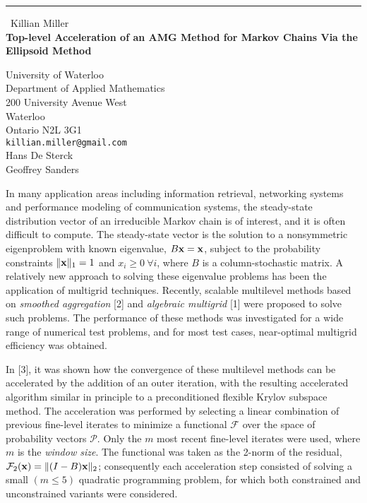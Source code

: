 \documentclass{report}
\begin{document}
\begin{center}
\rule{6in}{1pt} \
{\large Killian Miller \\
{\bf Top-level Acceleration of an AMG Method for Markov Chains Via the Ellipsoid Method}}

University of Waterloo \\ Department of Applied Mathematics \\ 200 University Avenue West \\ Waterloo \\ Ontario N2L 3G1
\\
{\tt killian.miller@gmail.com}\\
Hans De Sterck\\
Geoffrey Sanders\end{center}

\newcommand{\mF}{\mathcal{F}}
\newcommand{\mP}{\mathcal{P}}
\newcommand{\mV}{\mathcal{V}}
\newcommand{\bx}{{\bf x}}

In many application areas including information retrieval, networking
systems and performance modeling of communication systems, the
steady-state distribution vector of an irreducible Markov chain is of
interest, and it is often difficult to compute. The steady-state vector
is the solution to a nonsymmetric eigenproblem with known eigenvalue,
$B\bx = \bx$, subject to the probability constraints $\|\bx\|_1 = 1$ and
$x_i \geq 0~\forall i$, where $B$ is a column-stochastic matrix. A
relatively new approach to solving these eigenvalue problems has been the
application of multigrid techniques. Recently, scalable multilevel
methods based on {\em smoothed aggregation} [2] and {\em algebraic
multigrid} [1] were proposed to solve such problems. The performance of
these methods was investigated for a wide range of numerical test
problems, and for most test cases, near-optimal multigrid efficiency was
obtained.

In [3], it was shown how the convergence of these multilevel methods can
be accelerated by the addition of an outer iteration, with the resulting
accelerated algorithm similar in principle to a preconditioned flexible
Krylov subspace method. The acceleration was performed by selecting a
linear combination of previous fine-level iterates to minimize a
functional $\mF$
over the space of probability vectors $\mP$. Only the $m$ most recent
fine-level iterates were used, where $m$ is the {\em window size}. The
functional was taken as the 2-norm of the residual, $\mF_2(\bx) =
\|(I-B)\bx\|_2$; consequently each acceleration step consisted of solving
a small $(m \leq 5)$ quadratic programming problem, for which both
constrained and unconstrained variants were considered.
\end{document}
